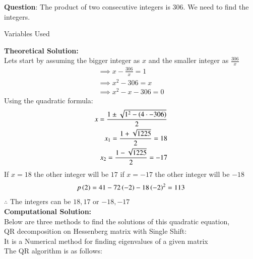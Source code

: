 \documentclass[journal]{IEEEtran}
\begin{document}
\textbf{Question}:\newline
The product of two consecutive integers is $306$. We need to find the integers.
\newline
\begin{table}[h!]    
  \centering
  
  \caption{Variables Used}
  \label{tab1.1.2.2}
\end{table}
\newline
\textbf{Theoretical Solution:}\\
Lets start by assuming the bigger integer as $x$ and the smaller integer as $\frac{306}{x}$
\begin{align}
    \implies x-\frac{306}{x}=1\\
    \implies x^2-306=x\\
    \implies x^2-x-306=0
\end{align}
Using the quadratic formula:
\begin{align}
    x=\frac{1\pm\sqrt{1^2-\left(4\cdot -306\right)}}{2}\\
    x_1=\frac{1+\sqrt{1225}}{2}=18\\
    x_2=\frac{1-\sqrt{1225}}{2}=-17
\end{align}
If $x=18$ the other integer will be $17$ if $x=-17$ the other integer will be $-18$
\begin{align}
    p\left(2\right)=41-72\left(-2\right)-18\left(-2\right)^2=113
\end{align}
$\therefore$ The integers can be $18,17$ or $-18,-17$\\
\textbf{Computational Solution:}\\
Below are three methods to find the solutions of this quadratic equation,\\
QR decomposition on Hessenberg matrix with Single Shift:\\
It is a Numerical method for finding eigenvalues of a given matrix\\
The QR algorithm is as follows:
\end{document}

